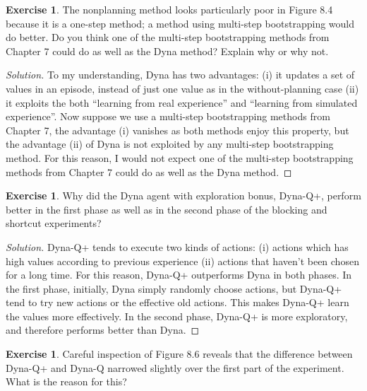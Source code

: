 \documentclass[oneside,11pt]{article}
\theoremstyle{definition}
\newtheorem{exer}[thm]{Exercise}
\newenvironment{solution}
{\renewcommand\qedsymbol{$\blacksquare$}\begin{proof}[Solution]} {\end{proof}}
\begin{document}
\begin{exer}
The nonplanning method looks particularly poor in Figure 8.4 because it is a one-step method; a method using multi-step bootstrapping would do better. Do you think one of the multi-step bootstrapping methods from Chapter 7 could do as well as the Dyna method? Explain why or why not.
\end{exer}


\begin{shaded}
\begin{solution} 
To my understanding, Dyna has two advantages: (i) it updates a set of values in an episode, instead of just one value as in the without-planning case (ii) it exploits the both ``learning from real experience'' and ``learning from simulated experience''. Now suppose we use a multi-step bootstrapping methods from Chapter 7, the advantage (i) vanishes as both methods enjoy this property, but the advantage (ii) of Dyna is not exploited by any multi-step bootstrapping method. For this reason, I would not expect one of the multi-step bootstrapping methods from Chapter 7 could do as well as the Dyna method. 

\end{solution} 
\end{shaded}


\begin{exer}
Why did the Dyna agent with exploration bonus, Dyna-Q+, perform better in the first phase as well as in the second phase of the blocking and shortcut experiments?
\end{exer}


\begin{shaded}
\begin{solution} 
Dyna-Q+ tends to execute two kinds of actions: (i) actions which has high values according to previous experience (ii) actions that haven't been chosen for a long time. For this reason,  Dyna-Q+ outperforms Dyna in both phases. In the first phase, initially, Dyna simply randomly choose actions, but Dyna-Q+ tend to try new actions or the effective old actions. This makes Dyna-Q+ learn the values more effectively. In the second phase, Dyna-Q+ is more exploratory, and therefore performs better than Dyna.


\end{solution} 
\end{shaded}



\begin{exer}
Careful inspection of Figure 8.6 reveals that the difference between Dyna-Q+ and Dyna-Q narrowed slightly over the first part of the experiment. What is the reason for this?
\end{exer}
\end{document}
